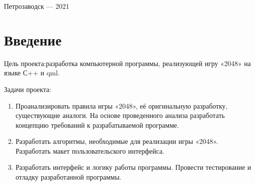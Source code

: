 \documentclass[a4paper,12pt]{article}
\begin{document}
\vfill

\begin{center}
\large
    Петрозаводск --- 2021
\end{center}



\newpage

\tableofcontents





\newpage
\section*{Введение}

Цель проекта:разработка компьютерной программы, реализующей игру «2048» на языке С++ и qml.


Задачи проекта: 
\begin{enumerate} 
    \item Проанализировать правила игры «2048», её оригинальную разработку, существующие аналоги. На основе проведенного анализа разработать концепцию требований к разрабатываемой программе.
    \item Разработать алгоритмы, необходимые для реализации игры «2048». Разработать макет пользовательского интерфейса.
    \item Разработать интерфейс и логику работы программы. Провести тестирование и отладку разработанной программы.
\end{enumerate}




\newpage
\end{document}
